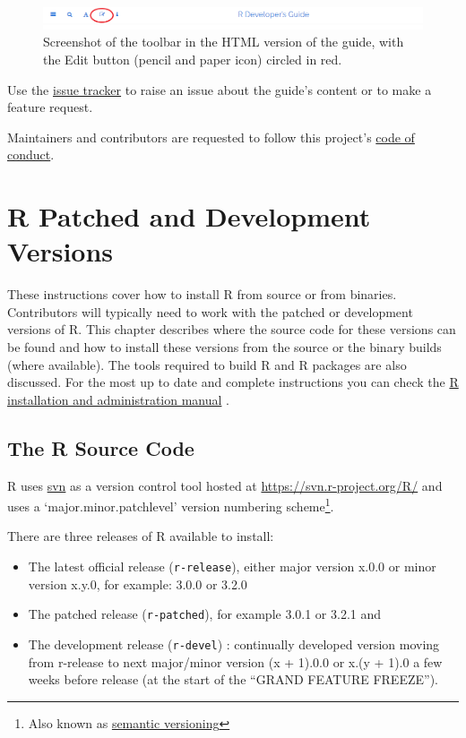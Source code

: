 \documentclass[
]{book}
\begin{document}
\begin{figure}
\centering
\includegraphics{img/edit_icon.png}
\caption{Screenshot of the toolbar in the HTML version of the guide, with the Edit button (pencil and paper icon) circled in red.}
\end{figure}

Use the \href{https://github.com/r-devel/rdevguide/issues}{issue tracker} to raise an issue about the guide's content or to make a feature request.

Maintainers and contributors are requested to follow this project's \href{https://github.com/r-devel/rdevguide/blob/main/CONDUCT.md}{code of conduct}.

\hypertarget{GetStart}{%
\chapter{R Patched and Development Versions}\label{GetStart}}

These instructions cover how to install R from source or from binaries.
Contributors will typically need to work with the patched or development versions of R.
This chapter describes where the source code for these versions can be found and how to install these versions from the source or the binary builds (where available).
The tools required to build R and R packages are also discussed.
For the most up to date and complete instructions you can check the \href{https://cran.r-project.org/doc/manuals/r-devel/R-admin.html}{R installation and administration manual} .

\hypertarget{the-r-source-code}{%
\section{The R Source Code}\label{the-r-source-code}}

R uses \href{https://subversion.apache.org/}{svn} as a version control tool hosted at \url{https://svn.r-project.org/R/} and uses a `major.minor.patchlevel' version numbering scheme\footnote{Also known as \href{https://en.wikipedia.org/wiki/Software_versioning\#Semantic_versioning}{semantic versioning}}.

There are three releases of R available to install:

\begin{itemize}
\item
  The latest official release (\texttt{r-release}), either major version x.0.0 or minor version x.y.0, for example: 3.0.0 or 3.2.0
\item
  The patched release (\texttt{r-patched}), for example 3.0.1 or 3.2.1 and
\item
  The development release (\texttt{r-devel}) : continually developed version moving from r-release to next major/minor version (x + 1).0.0 or x.(y + 1).0 a few weeks before release (at the start of the ``GRAND FEATURE FREEZE'').
\end{itemize}
\end{document}
